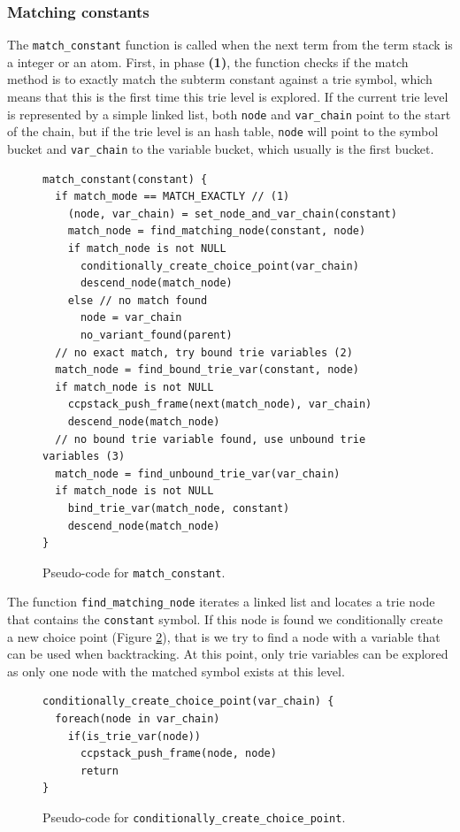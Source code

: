 \subsubsection{Matching constants}

The \texttt{match\_constant} function is called when the next term from the term stack is a integer or an
atom. First, in phase \textbf{(1)}, the function checks if the match method is to exactly match the
subterm constant against a trie symbol, which means
that this is the first time this trie level is explored. If the current trie level is represented by a simple
linked list, both \texttt{node} and \texttt{var\_chain} point to the start of the chain, but if the trie level
is an hash table, \texttt{node} will point to the symbol bucket and \texttt{var\_chain} to the variable
bucket, which usually is the first bucket.

\begin{figure}[ht]
\begin{Verbatim}[fontsize=\small]
match_constant(constant) {
  if match_mode == MATCH_EXACTLY // (1)
    (node, var_chain) = set_node_and_var_chain(constant)
    match_node = find_matching_node(constant, node)
    if match_node is not NULL
      conditionally_create_choice_point(var_chain)
      descend_node(match_node)
    else // no match found
      node = var_chain
      no_variant_found(parent)
  // no exact match, try bound trie variables (2)
  match_node = find_bound_trie_var(constant, node)
  if match_node is not NULL
    ccpstack_push_frame(next(match_node), var_chain)
    descend_node(match_node)
  // no bound trie variable found, use unbound trie variables (3)
  match_node = find_unbound_trie_var(var_chain)
  if match_node is not NULL
    bind_trie_var(match_node, constant)
    descend_node(match_node)
}
\end{Verbatim}
\caption{Pseudo-code for \texttt{match\_constant}.}
\label{fig:match_constant}
\end{figure}

The function \texttt{find\_matching\_node} iterates a linked list and locates a trie node that contains the
\texttt{constant} symbol. If this node is found we conditionally create a
new choice point (Figure \ref{fig:conditionally_create_choice_point}), that is
we try to find a node with a variable that can be used when backtracking. At this point, only
trie variables can be explored as only one node with the matched symbol exists at this level.

\begin{figure}[ht]
\begin{Verbatim}[fontsize=\small]
conditionally_create_choice_point(var_chain) {
  foreach(node in var_chain)
    if(is_trie_var(node))
      ccpstack_push_frame(node, node)
      return
}
\end{Verbatim}
\caption{Pseudo-code for \texttt{conditionally\_create\_choice\_point}.}
\label{fig:conditionally_create_choice_point}
\end{figure}

